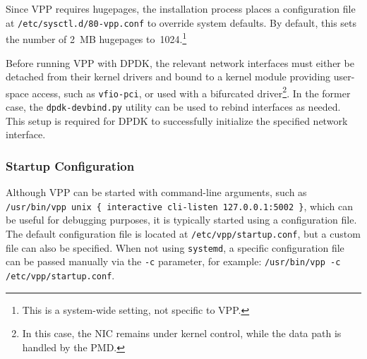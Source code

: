 Since VPP requires hugepages, the installation process places a configuration file at \texttt{/etc/sysctl.d/80-vpp.conf} to override system defaults. 
By default, this sets the number of 2~MB hugepages to~1024.\footnote{This is a system-wide setting, not specific to VPP.}~\cite{fdio-running}

Before running VPP with DPDK, the relevant network interfaces must either be detached from their kernel drivers and bound to a kernel module providing user-space access, such as \texttt{vfio-pci},
or used with a bifurcated driver\footnote{In this case, the NIC remains under kernel control, while the data path is handled by the PMD.}.
In the former case, the \texttt{dpdk-devbind.py} utility can be used to rebind interfaces as needed.
This setup is required for DPDK to successfully initialize the specified network interface.~\cite{dpdk-linux-drivers}

\subsubsection{Startup Configuration}
Although VPP can be started with command-line arguments, such as \verb|/usr/bin/vpp unix { interactive cli-listen 127.0.0.1:5002 }|, which can be useful for debugging purposes, 
it is typically started using a configuration file. 
The default configuration file is located at \texttt{/etc/vpp/startup.conf}, but a custom file can also be specified.
When not using \texttt{systemd}, a specific configuration file can be passed manually via the \texttt{-c} parameter, 
for example: \verb|/usr/bin/vpp -c /etc/vpp/startup.conf|.~\cite{fdio-config-getting-started} 

